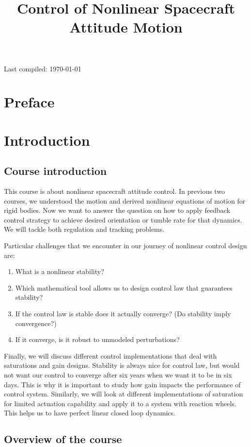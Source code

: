 \documentclass{article}
\title{Control of Nonlinear Spacecraft Attitude Motion}
\date{}
\begin{document}
\maketitle
Last compiled: \today

\newpage
\section*{Preface}
\newpage

\tableofcontents

\newpage
\section{Introduction}
\subsection{Course introduction}
This course is about nonlinear spacecraft attitude control. In previous two courses, we understood the motion and derived nonlinear equations of motion for rigid bodies. Now we want to answer the question on how to apply feedback control strategy to achieve desired orientation or tumble rate for that dynamics. We will tackle both regulation and tracking problems.

Particular challenges that we encounter in our journey of nonlinear control design are:
\begin{enumerate}
  \item What is a nonlinear stability?
  \item Which mathematical tool allows us to design control law that guarantees stability?
  \item If the control law is stable does it actually converge? (Do stability imply convergence?)
  \item If it converge, is it robust to unmodeled perturbations?
\end{enumerate}

Finally, we will discuss different control implementations that deal with saturations and gain designs. Stability is always nice for control law, but would not want  our control to converge after six years when we want it to be in six days. This is why it is important to study how gain impacts the performance of control system. Similarly, we will look at different implementations of saturation for limited actuation capability and apply it to a system with reaction wheels. This helps us to have perfect linear closed loop dynamics. 

\subsection{Overview of the course}
\end{document}
